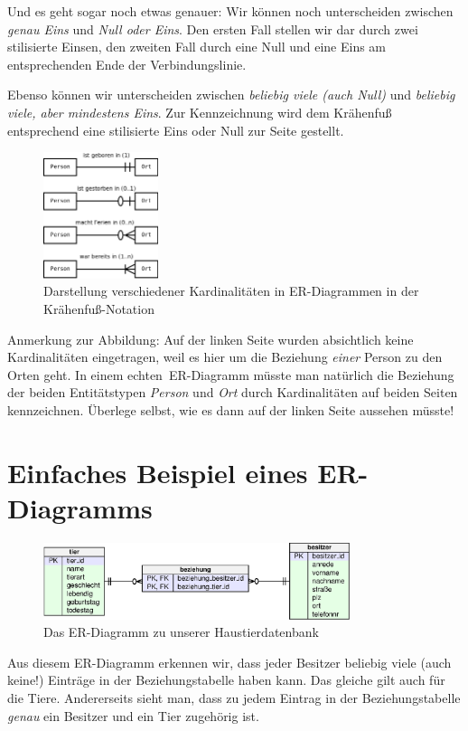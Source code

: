 Und es geht sogar noch etwas genauer: Wir können noch unterscheiden zwischen
\textit{genau Eins} und \textit{Null oder Eins}. Den ersten Fall stellen wir dar
durch zwei stilisierte Einsen, den zweiten Fall durch eine Null und eine Eins am
entsprechenden Ende der Verbindungslinie.

Ebenso können wir unterscheiden zwischen \textit{beliebig viele (auch Null)}
und \textit{beliebig viele, aber mindestens Eins}. Zur Kennzeichnung wird dem
Krähenfuß entsprechend eine stilisierte Eins oder Null zur Seite gestellt.

\begin{figure}[h]
  \centering
   \includegraphics[clip,width=0.3\textwidth]{./inf/SEKII/34_SQL_ER-Diagramme/Kardinalitaeten.png}
   \caption{Darstellung verschiedener Kardinalitäten in ER-Diagrammen in der
   Krähenfuß-Notation}
   \label{fig:kardinalitäten}
\end{figure}

Anmerkung zur Abbildung: Auf der linken Seite wurden absichtlich keine
Kardinalitäten eingetragen, weil es hier um die Beziehung \emph{einer} Person
zu den Orten geht. In einem \glqq echten\grqq\ ER-Diagramm müsste man natürlich
die Beziehung der beiden Entitätstypen \emph{Person} und \emph{Ort} durch
Kardinalitäten auf beiden Seiten kennzeichnen. Überlege selbst, wie es dann auf
der linken Seite aussehen müsste!



\section{Einfaches Beispiel eines ER-Diagramms}

\begin{figure}[h]
  \centering
   \includegraphics[clip,width=0.8\textwidth]{./inf/SEKII/34_SQL_ER-Diagramme/ermHaustier}
   \caption{Das ER-Diagramm zu unserer Haustierdatenbank}
   \label{fig:erstes-er-diagramm}
\end{figure}

Aus diesem ER-Diagramm erkennen wir, dass jeder Besitzer beliebig viele (auch
keine!) Einträge in der Beziehungstabelle haben kann. Das gleiche gilt auch für
die Tiere. Andererseits sieht man, dass zu jedem Eintrag in der
Beziehungstabelle \textit{genau} ein Besitzer und ein Tier zugehörig ist.

%
